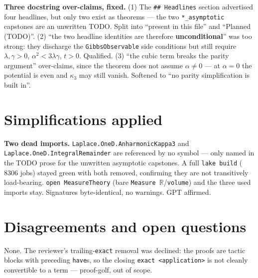 \documentclass[11pt]{article}
\begin{document}
\textbf{Three docstring over-claims, fixed.} (1) The \texttt{\#\# Headlines} section advertised
four headlines, but only two exist as theorems --- the two \texttt{*\_asymptotic} capstones are an
unwritten TODO. Split into ``present in this file'' and ``Planned (TODO)''. (2) ``the two headline
identities are therefore \textbf{unconditional}'' was too strong: they discharge the
\texttt{GibbsObservable} side conditions but still require $\lambda,\gamma>0$, $\alpha^2<3\lambda
\gamma$, $t>0$. Qualified. (3) ``the cubic term breaks the parity argument'' over-claims, since the
theorem does not assume $\alpha\ne0$ --- at $\alpha=0$ the potential is even and $\kappa_3$ may
still vanish. Softened to ``no parity simplification is built in''.

\section{Simplifications applied}
\textbf{Two dead imports.} \texttt{Laplace.OneD.AnharmonicKappa3} and
\texttt{Laplace.OneD.IntegralRemainder} are referenced by no symbol --- only named in the TODO
prose for the unwritten asymptotic capstones. A full \texttt{lake build} ($8306$ jobs) stayed green
with both removed, confirming they are not transitively load-bearing. \texttt{open MeasureTheory}
(bare \texttt{Measure $\mathbb R$}/\texttt{volume}) and the three used imports stay. Signatures
byte-identical, no warnings. GPT affirmed.

\section{Disagreements and open questions}
None. The reviewer's trailing-\texttt{exact} removal was declined: the proofs are tactic blocks
with preceding \texttt{have}s, so the closing \texttt{exact <application>} is not cleanly
convertible to a term --- proof-golf, out of scope.
\end{document}
